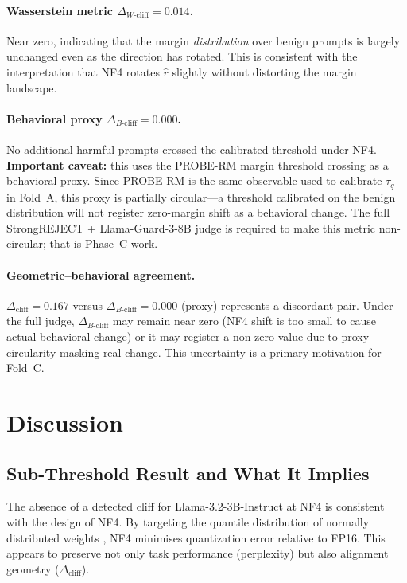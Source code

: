 \documentclass[11pt,a4paper]{article}
\newcommand{\cliff}{\Delta_{\mathrm{cliff}}}
\newcommand{\wcliff}{\Delta_{W\text{-cliff}}}
\newcommand{\bcliff}{\Delta_{B\text{-cliff}}}
\newcommand{\rhat}{\hat{r}}
\newcommand{\tauq}{\tau_q}
\begin{document}
\paragraph{Wasserstein metric $\wcliff = 0.014$.}
Near zero, indicating that the margin \emph{distribution} over benign prompts is
largely unchanged even as the direction has rotated.
This is consistent with the interpretation that NF4 rotates $\rhat$ slightly
without distorting the margin landscape.

\paragraph{Behavioral proxy $\bcliff = 0.000$.}
No additional harmful prompts crossed the calibrated threshold under NF4.
\textbf{Important caveat:} this uses the PROBE-RM margin threshold crossing as a
behavioral proxy.
Since PROBE-RM is the same observable used to calibrate $\tauq$ in Fold~A, this
proxy is partially circular---a threshold calibrated on the benign distribution
will not register zero-margin shift as a behavioral change.
The full StrongREJECT + Llama-Guard-3-8B judge is required to make this metric
non-circular; that is Phase~C work.

\paragraph{Geometric--behavioral agreement.}
$\cliff = 0.167$ versus $\bcliff = 0.000$ (proxy) represents a discordant pair.
Under the full judge, $\bcliff$ may remain near zero (NF4 shift is too small to
cause actual behavioral change) or it may register a non-zero value due to proxy
circularity masking real change.
This uncertainty is a primary motivation for Fold~C.

\section{Discussion}
\label{sec:discussion}

\subsection{Sub-Threshold Result and What It Implies}

The absence of a detected cliff for Llama-3.2-3B-Instruct at NF4 is consistent
with the design of NF4.
By targeting the quantile distribution of normally distributed weights
\citep{dettmers2023qlora}, NF4 minimises quantization error relative to FP16.
This appears to preserve not only task performance (perplexity) but also
alignment geometry ($\cliff$).
\end{document}
